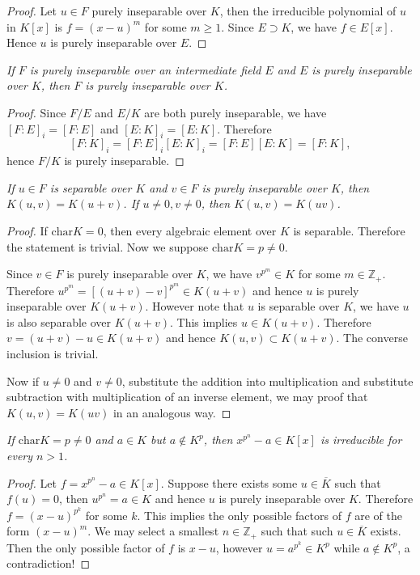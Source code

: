 \begin{proof}
Let $u\in F$ purely inseparable over $K$, then the irreducible polynomial of $u$ in $K[x]$ is $f=(x-u)^m$ for some $m\ge 1$. Since $E\supset K$, we have $f\in E[x]$. Hence $u$ is purely inseparable over $E$.
\end{proof}
\begin{problem}\em
If $F$ is purely inseparable over an intermediate field $E$ and $E$ is purely inseparable over $K$, then $F$ is purely inseparable over $K$.
\end{problem}
\begin{proof}
Since $F/E$ and $E/K$ are both purely inseparable, we have $[F:E]_i=[F:E]$ and $[E:K]_i=[E:K]$. Therefore 
$$
\left[ F:K \right] _i=\left[ F:E \right] _i\left[ E:K \right] _i=\left[ F:E \right] \left[ E:K \right] =\left[ F:K \right] ,
$$
hence $F/K$ is purely inseparable.
\end{proof}
\begin{problem}\em
If $u\in F$ is separable over $K$ and $v\in F$ is purely inseparable over $K$,
then $K(u, v)=K(u+v)$. If $u\neq 0, v\neq 0$, then $K(u, v)=K(uv)$.
\end{problem}
\begin{proof}
If $\mathrm{char}K=0$, then every algebraic element over $K$ is separable. Therefore the statement is trivial. Now we suppose $\mathrm{char}K=p\ne 0$.\par
Since $v\in F$ is purely inseparable over $K$, we have $v^{p^m}\in K$ for some $m\in\mathbb{Z}_+$. Therefore $u^{p^m}=[(u+v)-v]^{p^m}\in K(u+v)$ and hence $u$ is purely inseparable over $K(u+v)$. However note that $u$ is separable over $K$, we have $u$ is also separable over $K(u+v)$. This implies $u\in K(u+v)$. Therefore $v=(u+v)-u\in K(u+v)$ and hence $K(u,v)\subset K(u+v)$. The converse inclusion is trivial.\par
Now if $u\ne 0$ and $v\ne 0$, substitute the addition into multiplication and substitute subtraction with multiplication of an inverse element, we may proof that $K(u,v)=K(uv)$ in an analogous way. 
\end{proof}
\begin{problem}\em
If $\mathrm{char}K=p\neq 0$ and $a\in K$ but $a\notin K^p$, then $x^{p^n}-a\in K[x]$ is irreducible for every $n>1$.
\end{problem}
\begin{proof}
Let $f=x^{p^n}-a\in K[x]$. Suppose there exists some $u\in\overline{K}$ such that $f(u)=0$, then $u^{p^n}=a\in K$ and hence $u$ is purely inseparable over $K$. Therefore $f=(x-u)^{p^k}$ for some $k$. This implies the only possible factors of $f$ are of the form $(x-u)^m$. We may select a smallest $n\in\mathbb{Z}_+$ such that such $u\in\overline{K}$ exists. Then the only possible factor of $f$ is $x-u$, however $u=a^{p^k}\in K^p$ while $a\notin K^p$, a contradiction!
\end{proof}
